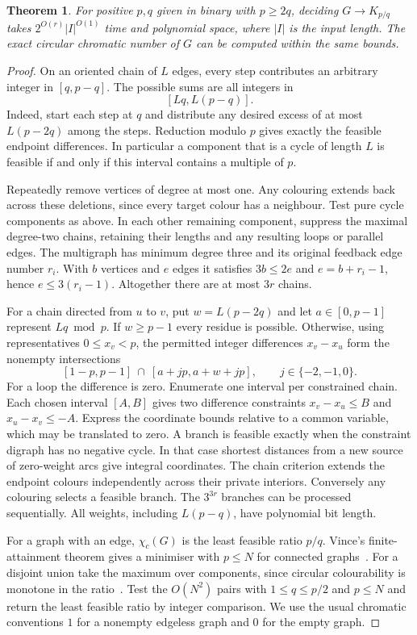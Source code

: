 \documentclass[11pt]{article}
\newtheorem{theorem}{Theorem}
\theoremstyle{remark}
\begin{document}
\begin{theorem}\label{thm:edge-alg}
For positive $p,q$ given in binary with $p\geq2q$, deciding
$G\to K_{p/q}$ takes $2^{O(r)}|I|^{O(1)}$ time and polynomial space,
where $|I|$ is the input length. The exact circular chromatic number of
$G$ can be computed within the same bounds.
\end{theorem}
\begin{proof}
On an oriented chain of $L$ edges, every step contributes an arbitrary
integer in $[q,p-q]$. The possible sums are all integers in
\[
                 [Lq,L(p-q)].
\]
Indeed, start each step at $q$ and distribute any desired excess of at most
$L(p-2q)$ among the steps. Reduction modulo $p$ gives exactly the feasible
endpoint differences. In particular a component that is a cycle of length
$L$ is feasible if and only if this interval contains a multiple of $p$.

Repeatedly remove vertices of degree at most one. Any colouring extends
back across these deletions, since every target colour has a neighbour.
Test pure cycle components as above. In each other remaining component,
suppress the maximal degree-two chains, retaining their lengths and any
resulting loops or parallel edges. The multigraph has minimum degree
three and its original feedback edge number $r_i$. With $b$ vertices
and $e$ edges it satisfies $3b\leq2e$ and $e=b+r_i-1$, hence
$e\leq3(r_i-1)$. Altogether there are at most $3r$ chains.

For a chain directed from $u$ to $v$, put $w=L(p-2q)$ and let
$a\in[0,p-1]$ represent $Lq\bmod p$. If $w\geq p-1$ every residue is
possible. Otherwise, using representatives $0\leq x_v<p$, the permitted
integer differences $x_v-x_u$ form the nonempty intersections
\[
 [1-p,p-1]\ \cap\ [a+jp,a+w+jp],\qquad j\in\{-2,-1,0\}.
\]
For a loop the difference is zero. Enumerate one interval per constrained
chain. Each chosen interval $[A,B]$ gives two difference constraints
$x_v-x_u\leq B$ and $x_u-x_v\leq-A$. Express the coordinate bounds relative
to a common variable, which may be translated to zero. A branch is feasible
exactly when the constraint digraph has no negative cycle. In that case
shortest distances from a new source of zero-weight arcs give integral
coordinates. The chain criterion extends the endpoint colours independently
across their private interiors. Conversely any colouring selects a feasible
branch. The $3^{3r}$ branches can be processed sequentially. All weights,
including $L(p-q)$, have polynomial bit length.

For a graph with an edge, $\chi_c(G)$ is the least feasible ratio $p/q$.
Vince's finite-attainment theorem gives a minimiser with $p\leq N$
for connected graphs~\cite[Theorem~3]{vince1988}. For a disjoint union
take the maximum over components, since circular colourability is
monotone in the ratio~\cite{zhu2001}. Test the $O(N^2)$ pairs with
$1\leq q\leq p/2$ and $p\leq N$ and return the least feasible ratio by
integer comparison. We use the usual chromatic conventions $1$ for a
nonempty edgeless graph and $0$ for the empty graph.
\end{proof}
\end{document}
